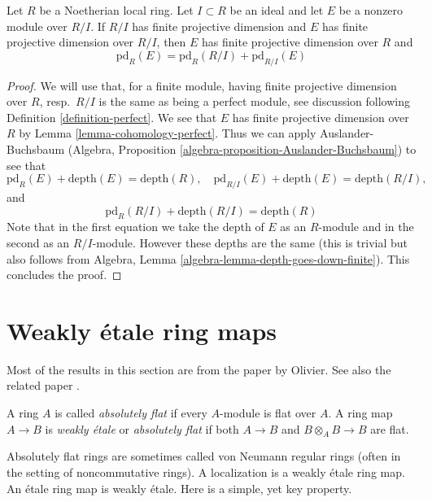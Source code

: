 \begin{lemma}
\label{lemma-additivity-of-pd}
Let $R$ be a Noetherian local ring. Let $I \subset R$ be an ideal
and let $E$ be a nonzero module over $R/I$. If $R/I$ has finite projective
dimension and $E$ has finite projective dimension over $R/I$, then
$E$ has finite projective dimension over $R$ and
$$
\text{pd}_R(E) = \text{pd}_R(R/I) + \text{pd}_{R/I}(E)
$$
\end{lemma}

\begin{proof}
We will use that, for a finite module, having finite projective dimension
over $R$, resp.\ $R/I$ is the same as being a perfect module, see
discussion following Definition \ref{definition-perfect}.
We see that $E$ has finite projective dimension
over $R$ by Lemma \ref{lemma-cohomology-perfect}.
Thus we can apply Auslander-Buchsbaum (Algebra, Proposition
\ref{algebra-proposition-Auslander-Buchsbaum}) to see that
$$
\text{pd}_R(E) + \text{depth}(E) = \text{depth}(R),\quad
\text{pd}_{R/I}(E) + \text{depth}(E) = \text{depth}(R/I),
$$
and
$$
\text{pd}_R(R/I) + \text{depth}(R/I) = \text{depth}(R)
$$
Note that in the first equation we take the depth of $E$
as an $R$-module and in the second as an $R/I$-module.
However these depths are the same (this is trivial but
also follows from Algebra, Lemma \ref{algebra-lemma-depth-goes-down-finite}).
This concludes the proof.
\end{proof}





\section{Weakly \'etale ring maps}
\label{section-weakly-etale}

\noindent
Most of the results in this section are from the paper
\cite{Olivier-AF} by Olivier. See also the related paper
\cite{Ferrand-epi}.

\begin{definition}
\label{definition-weakly-etale}
A ring $A$ is called {\it absolutely flat} if every $A$-module is flat over
$A$. A ring map $A \to B$ is {\it weakly \'etale} or {\it absolutely flat}
if both $A \to B$ and $B \otimes_A B \to B$ are flat.
\end{definition}

\noindent
Absolutely flat rings are sometimes called von Neumann regular rings
(often in the setting of noncommutative rings). A localization is a
weakly \'etale ring map. An \'etale ring map is weakly
\'etale. Here is a simple, yet key property.

